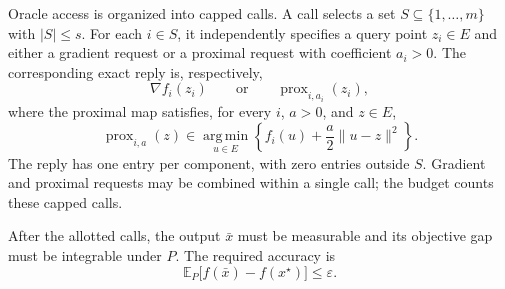 \documentclass[10pt]{article}
\theoremstyle{definition}
\begin{document}
Oracle access is organized into capped calls. A call selects a set $S\subseteq\{1,\ldots,m\}$ with $|S|\leq s$. For each $i\in S$, it independently specifies a query point $z_i\in E$ and either a gradient request or a proximal request with coefficient $a_i>0$. The corresponding exact reply is, respectively,
\[
\nabla f_i(z_i)
\qquad\text{or}\qquad
\operatorname{prox}_{i,a_i}(z_i),
\]
where the proximal map satisfies, for every $i$, $a>0$, and $z\in E$,
\[
\operatorname{prox}_{i,a}(z)
\in\operatorname*{arg\,min}_{u\in E}
\left\{f_i(u)+\frac{a}{2}\|u-z\|^2\right\}.
\]
The reply has one entry per component, with zero entries outside $S$. Gradient and proximal requests may be combined within a single call; the budget counts these capped calls.

After the allotted calls, the output $\bar{x}$ must be measurable and its objective gap must be integrable under $P$. The required accuracy is
\[
\mathbb{E}_{P}\bigl[f(\bar{x})-f(x^\star)\bigr]\leq\varepsilon.
\]
\end{document}
